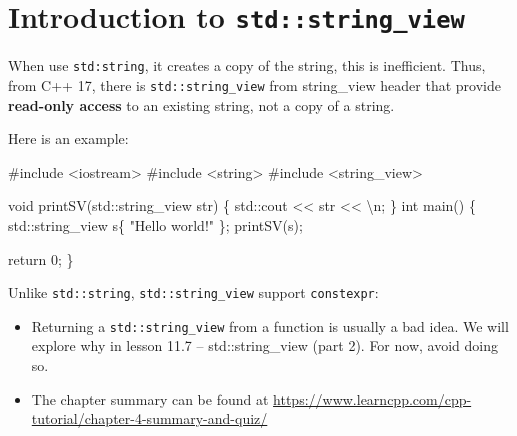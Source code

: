 \documentclass[
  letterpaper,
  DIV=11,
  numbers=noendperiod]{scrreprt}
\newenvironment{Shaded}{\begin{snugshade}}{\end{snugshade}}
\newcommand{\CommentTok}[1]{\textcolor[rgb]{0.37,0.37,0.37}{#1}}
\newcommand{\DecValTok}[1]{\textcolor[rgb]{0.68,0.00,0.00}{#1}}
\newcommand{\ErrorTok}[1]{\textcolor[rgb]{0.68,0.00,0.00}{#1}}
\newcommand{\FunctionTok}[1]{\textcolor[rgb]{0.28,0.35,0.67}{#1}}
\newcommand{\NormalTok}[1]{\textcolor[rgb]{0.00,0.23,0.31}{#1}}
\newcommand{\SpecialCharTok}[1]{\textcolor[rgb]{0.37,0.37,0.37}{#1}}
\newcommand{\StringTok}[1]{\textcolor[rgb]{0.13,0.47,0.30}{#1}}
\begin{document}
\hypertarget{introduction-to-stdstring_view}{%
\section{\texorpdfstring{Introduction to
\texttt{std::string\_view}}{Introduction to std::string\_view}}\label{introduction-to-stdstring_view}}

When use \texttt{std:string}, it creates a copy of the string, this is
inefficient. Thus, from C++ 17, there is \texttt{std::string\_view} from
string\_view header that provide \textbf{read-only access} to an
existing string, not a copy of a string.

Here is an example:

\begin{Shaded}
\begin{Highlighting}[]
\CommentTok{\#include \textless{}iostream\textgreater{}}
\CommentTok{\#include \textless{}string\textgreater{}}
\CommentTok{\#include \textless{}string\_view\textgreater{}}

\NormalTok{void }\FunctionTok{printSV}\NormalTok{(std}\SpecialCharTok{::}\NormalTok{string\_view str)}
\NormalTok{\{}
\NormalTok{    std}\SpecialCharTok{::}\NormalTok{cout }\SpecialCharTok{\textless{}}\ErrorTok{\textless{}}\NormalTok{ str }\SpecialCharTok{\textless{}}\ErrorTok{\textless{}} \StringTok{\textquotesingle{}}\SpecialCharTok{\textbackslash{}n}\StringTok{\textquotesingle{}}\NormalTok{;}
\NormalTok{\}}
\NormalTok{int }\FunctionTok{main}\NormalTok{()}
\NormalTok{\{}
\NormalTok{    std}\SpecialCharTok{::}\NormalTok{string\_view s\{ }\StringTok{"Hello world!"}\NormalTok{ \};}
    \FunctionTok{printSV}\NormalTok{(s);}

\NormalTok{    return }\DecValTok{0}\NormalTok{;}
\NormalTok{\}}
\end{Highlighting}
\end{Shaded}

Unlike \texttt{std::string}, \texttt{std::string\_view} support
\texttt{constexpr}:

\begin{tcolorbox}[enhanced jigsaw, toprule=.15mm, rightrule=.15mm, opacityback=0, breakable, leftrule=.75mm, colback=white, colframe=quarto-callout-note-color-frame, arc=.35mm, left=2mm, bottomrule=.15mm]
\begin{minipage}[t]{5.5mm}
\textcolor{quarto-callout-note-color}{\faInfo}
\end{minipage}%
\begin{minipage}[t]{\textwidth - 5.5mm}

\begin{itemize}
\item
  Returning a \texttt{std::string\_view} from a function is usually a
  bad idea. We will explore why in lesson 11.7 -- std::string\_view
  (part 2). For now, avoid doing so.
\item
  The chapter summary can be found at
  \url{https://www.learncpp.com/cpp-tutorial/chapter-4-summary-and-quiz/}
\end{itemize}

\end{minipage}%
\end{tcolorbox}
\end{document}
